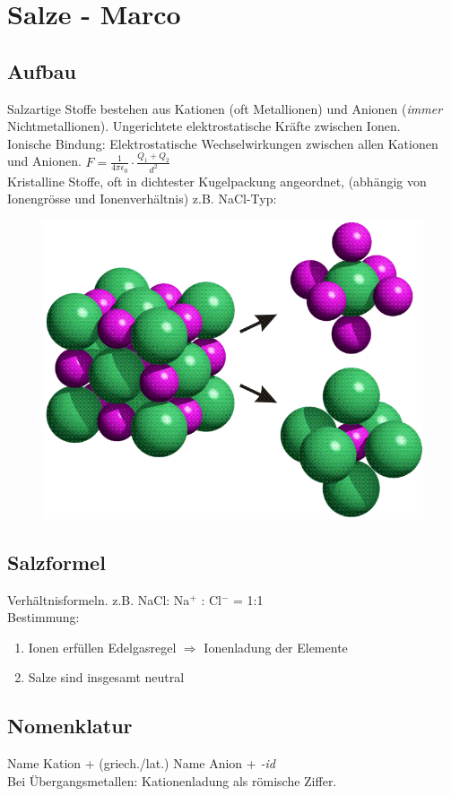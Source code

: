\section{Salze - Marco}

\subsection{Aufbau}
Salzartige Stoffe bestehen aus Kationen (oft Metallionen) und Anionen (\emph{immer} Nichtmetallionen). Ungerichtete elektrostatische Kräfte zwischen Ionen.\\

Ionische Bindung: Elektrostatische Wechselwirkungen zwischen allen Kationen und Anionen. $F = \frac{1}{4 \pi \epsilon_0} \cdot \frac{Q_1 + Q_2}{d^2}$ \\

Kristalline Stoffe, oft in dichtester Kugelpackung angeordnet, (abhängig von Ionengrösse und Ionenverhältnis) z.B. NaCl-Typ:
\begin{figure}[htbp]
	\centering
	\includegraphics[width=0.5\linewidth]{images/5_Elementarzelle_NaCl.png}
\end{figure}

\subsection{Salzformel}
Verhältnisformeln. z.B. NaCl: Na$^+$ : Cl$^-$ = 1:1 \\

Bestimmung:
\begin{enumerate}
	\item Ionen erfüllen Edelgasregel $\Rightarrow$ Ionenladung der Elemente
	\item Salze sind insgesamt neutral
\end{enumerate}

\subsection{Nomenklatur}
Name Kation + (griech./lat.) Name Anion + \emph{-id} \\
Bei Übergangsmetallen: Kationenladung als römische Ziffer. \\

